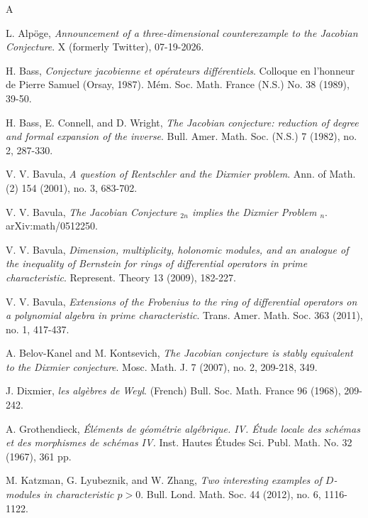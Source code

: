 \documentclass[11pt]{amsart}
\theoremstyle{definition}
\theoremstyle{remark}
\numberwithin{equation}{subsection}
\begin{document}
\begin{thebibliography}{A}

L. Alp\"{o}ge, \emph{Announcement of a three-dimensional counterexample to the {Jacobian Conjecture}}. X (formerly Twitter), 07-19-2026.


H. Bass, \emph{Conjecture jacobienne et op\'{e}rateurs diff\'{e}rentiels}. Colloque en l'honneur de Pierre Samuel (Orsay, 1987). M\'{e}m. Soc. Math. France (N.S.) No. 38 (1989), 39-50. 

H. Bass, E. Connell, and D. Wright, \emph{The Jacobian conjecture: reduction of degree and formal expansion of the inverse}. Bull. Amer. Math. Soc. (N.S.) 7 (1982), no. 2, 287-330. 

V. V. Bavula, \emph{A question of Rentschler and the Dixmier problem}. Ann. of Math. (2) 154 (2001), no. 3, 683-702. 

V. V. Bavula, \emph{The Jacobian Conjecture \({}_{2n}\) implies the Dixmier Problem \({}_{n}\)}. arXiv:math/0512250.

V. V. Bavula, \emph{Dimension, multiplicity, holonomic modules, and an analogue of the inequality of Bernstein for rings of differential operators in prime characteristic}. Represent. Theory 13 (2009), 182-227.  

V. V. Bavula, \emph{Extensions of the Frobenius to the ring of differential operators on a polynomial algebra in prime characteristic}. Trans. Amer. Math. Soc. 363 (2011), no. 1, 417-437. 


A. Belov-Kanel and M. Kontsevich, \emph{The Jacobian conjecture is stably equivalent to the Dixmier conjecture}. Mosc. Math. J. 7 (2007), no. 2, 209-218, 349. 

J. Dixmier, \emph{les alg\`{e}bres de Weyl}. (French) Bull. Soc. Math. France 96 (1968), 209-242. 


A. Grothendieck, \emph{\'{E}l\'{e}ments de g\'{e}om\'{e}trie alg\'{e}brique. IV. \'{E}tude locale des sch\'{e}mas et des morphismes de sch\'{e}mas IV.} Inst. Hautes \'{E}tudes Sci. Publ. Math. No. 32 (1967), 361 pp. 

M. Katzman, G. Lyubeznik, and W. Zhang, \emph{Two interesting examples of {$D$}-modules in characteristic {$p>0$}}. Bull. Lond. Math. Soc. 44 (2012), no. 6, 1116-1122. 
 

\end{thebibliography}
\end{document}
